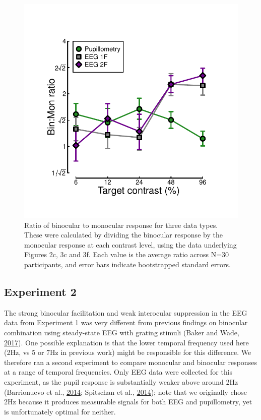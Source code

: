 \documentclass[
]{article}
\begin{document}
\begin{figure}

{\centering \includegraphics[width=0.5\linewidth]{Figures/BSratios} 

}

\caption{Ratio of binocular to monocular response for three data types. These were calculated by dividing the binocular response by the monocular response at each contrast level, using the data underlying Figures 2c, 3c and 3f. Each value is the average ratio across N=30 participants, and error bars indicate bootstrapped standard errors.}\label{fig:BSratios}
\end{figure}

\hypertarget{experiment-2}{%
\subsection{Experiment 2}\label{experiment-2}}

The strong binocular facilitation and weak interocular suppression in the EEG data from Experiment 1 was very different from previous findings on binocular combination using steady-state EEG with grating stimuli (Baker and Wade, \protect\hyperlink{ref-Baker2017}{2017}). One possible explanation is that the lower temporal frequency used here (2Hz, vs 5 or 7Hz in previous work) might be responsible for this difference. We therefore ran a second experiment to compare monocular and binocular responses at a range of temporal frequencies. Only EEG data were collected for this experiment, as the pupil response is substantially weaker above around 2Hz (Barrionuevo et al., \protect\hyperlink{ref-Barrionuevo2014}{2014}; Spitschan et al., \protect\hyperlink{ref-Spitschan2014}{2014}); note that we originally chose 2Hz because it produces measurable signals for both EEG and pupillometry, yet is unfortunately optimal for neither.
\end{document}
